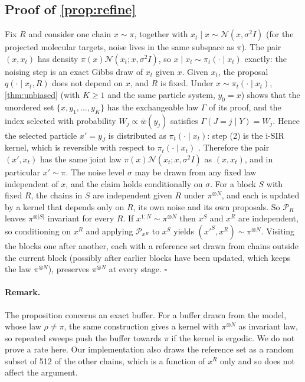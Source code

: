 \subsection{Proof of \cref{prop:refine}}
Fix $R$ and consider one chain $x\sim\pi$, together with $x_t\mid x\sim\mathcal{N}(x,\sigma^2 I)$ (for the projected molecular targets, noise lives in the same subspace as $\pi$). The pair $(x,x_t)$ has density $\pi(x)\mathcal{N}(x_t;x,\sigma^2I)$, so $x\mid x_t\sim\pi_t(\cdot\mid x_t)$ exactly: the noising step is an exact Gibbs draw of $x_t$ given $x$.
Given $x_t$, the proposal $q(\cdot\mid x_t,R)$ does not depend on $x$, and $R$ is fixed. Under $x\sim\pi_t(\cdot\mid x_t)$, \cref{thm:unbiased} (with $K\ge1$ and the same particle system, $y_0=x$) shows that the unordered set $\{x,y_1,\dots,y_K\}$ has the exchangeable law $\Gamma$ of its proof, and the index selected with probability $W_j\propto\bar w(y_j)$ satisfies $\Gamma(J=j\mid Y)=W_j$. Hence the selected particle $x'=y_J$ is distributed as $\pi_t(\cdot\mid x_t)$: step (2) is the i-SIR kernel, which is reversible with respect to $\pi_t(\cdot\mid x_t)$ \citep{andrieu2010particle}. Therefore the pair $(x',x_t)$ has the same joint law $\pi(x)\mathcal{N}(x_t;x,\sigma^2I)$ as $(x,x_t)$, and in particular $x'\sim\pi$. The noise level $\sigma$ may be drawn from any fixed law independent of $x$, and the claim holds conditionally on $\sigma$.
For a block $S$ with fixed $R$, the chains in $S$ are independent given $R$ under $\pi^{\otimes N}$, and each is updated by a kernel that depends only on $R$, its own noise and its own proposals. So $\mathcal{P}_R$ leaves $\pi^{\otimes|S|}$ invariant for every $R$. If $x^{1:N}\sim\pi^{\otimes N}$ then $x^S$ and $x^{R}$ are independent, so conditioning on $x^R$ and applying $\mathcal{P}_{x^R}$ to $x^S$ yields $(x'^{S},x^{R})\sim\pi^{\otimes N}$. Visiting the blocks one after another, each with a reference set drawn from chains outside the current block (possibly after earlier blocks have been updated, which keeps the law $\pi^{\otimes N}$), preserves $\pi^{\otimes N}$ at every stage. \hfill$\square$

\paragraph{Remark.} The proposition concerns an exact buffer. For a buffer drawn from the model, whose law $\rho\neq\pi$, the same construction gives a kernel with $\pi^{\otimes N}$ as invariant law, so repeated sweeps push the buffer towards $\pi$ if the kernel is ergodic. We do not prove a rate here. Our implementation also draws the reference set as a random subset of 512 of the other chains, which is a function of $x^R$ only and so does not affect the argument.

